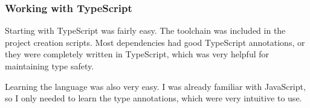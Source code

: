 \subsubsection{Working with TypeScript}\label{working-with-typescript}

Starting with TypeScript was fairly easy.
The toolchain was included in the project creation scripts.
Most dependencies had good TypeScript annotations,
or they were completely written in TypeScript,
which was very helpful for maintaining type safety.

Learning the language was also very easy.
I was already familiar with JavaScript,
so I only needed to learn the type annotations,
which were very intuitive to use.
